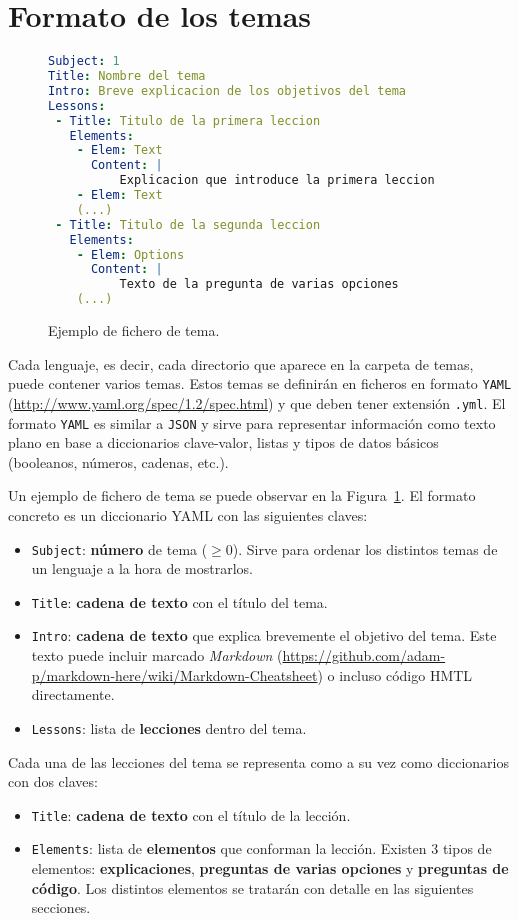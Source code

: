 \documentclass[]{article}
\newcommand{\code}[1]{{\lstinline[basicstyle=\sffamily,mathescape]!#1!}}
\begin{document}
\section{Formato de los temas}
\begin{figure}[tbp]
\begin{lstlisting}[language=yaml]
Subject: 1
Title: Nombre del tema
Intro: Breve explicacion de los objetivos del tema
Lessons:
 - Title: Titulo de la primera leccion
   Elements:
    - Elem: Text
      Content: |
          Explicacion que introduce la primera leccion
    - Elem: Text
    (...)
 - Title: Titulo de la segunda leccion
   Elements:
    - Elem: Options
      Content: |
          Texto de la pregunta de varias opciones
    (...)
\end{lstlisting}
\caption{Ejemplo de fichero de tema.\label{fig:tema}}
\end{figure}

Cada lenguaje, es decir, cada directorio que aparece en la carpeta de temas, puede contener varios temas. Estos temas se definirán en ficheros en formato \code{YAML} (\url{http://www.yaml.org/spec/1.2/spec.html}) y que deben tener extensión \code{.yml}. El formato \code{YAML} es similar a \code{JSON} y sirve para representar información como texto plano en base a diccionarios clave-valor, listas y tipos de datos básicos (booleanos, números, cadenas, etc.).

Un ejemplo de fichero de tema se puede observar en la Figura~\ref{fig:tema}. El formato concreto es un diccionario YAML con las siguientes claves:
\begin{itemize}
\item \code{Subject}: \textbf{número} de tema ($\geq 0$). Sirve para ordenar los distintos temas de un lenguaje a la hora de mostrarlos.
\item \code{Title}: \textbf{cadena de texto} con el título del tema. 
\item \code{Intro}: \textbf{cadena de texto} que explica brevemente el objetivo del tema. Este texto puede incluir marcado \emph{Markdown} (\url{https://github.com/adam-p/markdown-here/wiki/Markdown-Cheatsheet}) o incluso código HMTL directamente.
\item \code{Lessons}: lista de \textbf{lecciones} dentro del tema.
\end{itemize}

Cada una de las lecciones del tema se representa como a su vez como diccionarios con dos claves:
\begin{itemize}
\item \code{Title}: \textbf{cadena de texto} con el título de la lección.
\item \code{Elements}: lista de \textbf{elementos} que conforman la lección. Existen 3 tipos de elementos: \textbf{explicaciones}, \textbf{preguntas de varias opciones} y \textbf{preguntas de código}. Los distintos elementos se tratarán con detalle en las siguientes secciones.
\end{itemize}
\end{document}
